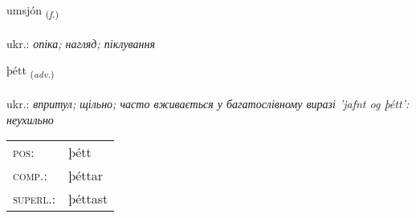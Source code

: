 \documentclass[frontgrid, backgrid]{flacards}\usepackage[]{graphicx}\usepackage[]{xcolor}
\begin{document}
\renewcommand{\blhead}{\vskip5pt {\small\bfseries\footnotesize Nafnorð | іменник }}
\renewcommand{\bcfoot}{\vskip5pt \hspace{2pt}{\small\bfseries\footnotesize 2K}}


{umsjón \small{\textsubscript{(\textit{f.})}} \\[1ex] %
\textphonetic{[ʏmsjoun]} \\
ukr.: \emph{опіка; нагляд; піклування} \\  [2ex]
\renewcommand*{\arraystretch}{0.8}
}

\renewcommand{\flhead}{\vskip5pt \fboxsep=0pt {\small\bfseries\footnotesize Atviksorð | прислівник}}
\renewcommand{\fcfoot}{\vskip5pt \fboxsep=0pt \hspace{2pt}{\small\bfseries\footnotesize 2K}}

\renewcommand{\blhead}{\vskip5pt {\small\bfseries\footnotesize Atviksorð | прислівник }}
\renewcommand{\bcfoot}{\vskip5pt \hspace{2pt}{\small\bfseries\footnotesize 2K}}


{þétt \small{\textsubscript{(\textit{adv.})}} \\[1ex] %
\textphonetic{[θjɛht]} \\
ukr.: \emph{впритул; щільно; часто вживається у багатослівному виразі 'jafnt og þétt': неухильно} \\  [2ex]
\renewcommand*{\arraystretch}{0.8}
\begin{tabular}{ll}
\textsc{pos}: & þétt \\ 
\textsc{comp.}: & þéttar \\ 
\textsc{superl.}: & þéttast \\
\end{tabular}
}
\end{document}
